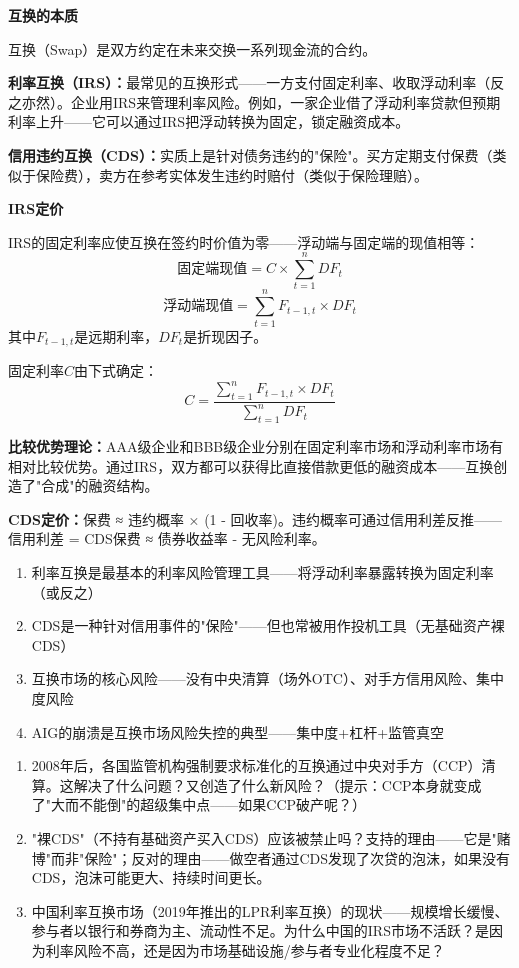 \documentclass[a4paper,11pt]{ctexbook}
\begin{document}
\begin{qualitative}
\textbf{互换的本质}

互换（Swap）是双方约定在未来交换一系列现金流的合约。

\textbf{利率互换（IRS）：}最常见的互换形式——一方支付固定利率、收取浮动利率（反之亦然）。企业用IRS来管理利率风险。例如，一家企业借了浮动利率贷款但预期利率上升——它可以通过IRS把浮动转换为固定，锁定融资成本。

\textbf{信用违约互换（CDS）：}实质上是针对债务违约的"保险"。买方定期支付保费（类似于保险费），卖方在参考实体发生违约时赔付（类似于保险理赔）。
\end{qualitative}

\begin{quantitative}
\textbf{IRS定价}

IRS的固定利率应使互换在签约时价值为零——浮动端与固定端的现值相等：
\[
\text{固定端现值} = C \times \sum_{t=1}^{n} DF_t
\]
\[
\text{浮动端现值} = \sum_{t=1}^{n} F_{t-1,t} \times DF_t
\]
其中$F_{t-1,t}$是远期利率，$DF_t$是折现因子。

固定利率$C$由下式确定：
\[
C = \frac{\sum_{t=1}^{n} F_{t-1,t} \times DF_t}{\sum_{t=1}^{n} DF_t}
\]

\textbf{比较优势理论：}AAA级企业和BBB级企业分别在固定利率市场和浮动利率市场有相对比较优势。通过IRS，双方都可以获得比直接借款更低的融资成本——互换创造了"合成"的融资结构。

\textbf{CDS定价：}保费 ≈ 违约概率 × (1 - 回收率)。违约概率可通过信用利差反推——信用利差 = CDS保费 ≈ 债券收益率 - 无风险利率。
\end{quantitative}

\begin{lessonsummary}
\begin{enumerate}
  \item 利率互换是最基本的利率风险管理工具——将浮动利率暴露转换为固定利率（或反之）
  \item CDS是一种针对信用事件的"保险"——但也常被用作投机工具（无基础资产裸CDS）
  \item 互换市场的核心风险——没有中央清算（场外OTC）、对手方信用风险、集中度风险
  \item AIG的崩溃是互换市场风险失控的典型——集中度+杠杆+监管真空
\end{enumerate}
\end{lessonsummary}

\begin{discuss}
\begin{enumerate}
  \item 2008年后，各国监管机构强制要求标准化的互换通过中央对手方（CCP）清算。这解决了什么问题？又创造了什么新风险？（提示：CCP本身就变成了"大而不能倒"的超级集中点——如果CCP破产呢？）
  \item "裸CDS"（不持有基础资产买入CDS）应该被禁止吗？支持的理由——它是"赌博"而非"保险"；反对的理由——做空者通过CDS发现了次贷的泡沫，如果没有CDS，泡沫可能更大、持续时间更长。
  \item 中国利率互换市场（2019年推出的LPR利率互换）的现状——规模增长缓慢、参与者以银行和券商为主、流动性不足。为什么中国的IRS市场不活跃？是因为利率风险不高，还是因为市场基础设施/参与者专业化程度不足？
\end{enumerate}
\end{discuss}
\end{document}
